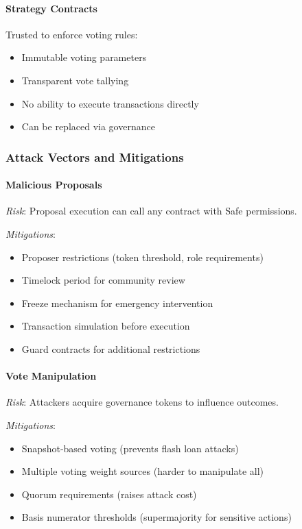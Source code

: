\documentclass[11pt,a4paper]{article}
\begin{document}
\paragraph{Strategy Contracts} Trusted to enforce voting rules:
\begin{itemize}
    \item Immutable voting parameters
    \item Transparent vote tallying
    \item No ability to execute transactions directly
    \item Can be replaced via governance
\end{itemize}

\subsubsection{Attack Vectors and Mitigations}

\paragraph{Malicious Proposals}

\textit{Risk}: Proposal execution can call any contract with Safe permissions.

\textit{Mitigations}:
\begin{itemize}
    \item Proposer restrictions (token threshold, role requirements)
    \item Timelock period for community review
    \item Freeze mechanism for emergency intervention
    \item Transaction simulation before execution
    \item Guard contracts for additional restrictions
\end{itemize}

\paragraph{Vote Manipulation}

\textit{Risk}: Attackers acquire governance tokens to influence outcomes.

\textit{Mitigations}:
\begin{itemize}
    \item Snapshot-based voting (prevents flash loan attacks)
    \item Multiple voting weight sources (harder to manipulate all)
    \item Quorum requirements (raises attack cost)
    \item Basis numerator thresholds (supermajority for sensitive actions)
\end{itemize}
\end{document}
